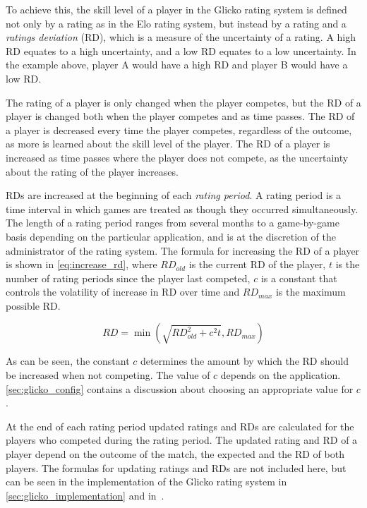 To achieve this, the skill level of a player in the Glicko rating system is defined not only by a rating as in the Elo rating system, but instead by a rating and a \emph{ratings deviation} (RD), which is a measure of the uncertainty of a rating.
A high RD equates to a high uncertainty, and a low RD equates to a low uncertainty.
In the example above, player A would have a high RD and player B would have a low RD.

The rating of a player is only changed when the player competes, but the RD of a player is changed both when the player competes and as time passes.
The RD of a player is decreased every time the player competes, regardless of the outcome, as more is learned about the skill level of the player.
The RD of a player is increased as time passes where the player does not compete, as the uncertainty about the rating of the player increases.

RDs are increased at the beginning of each \emph{rating period}.
A rating period is a time interval in which games are treated as though they occurred simultaneously.
The length of a rating period ranges from several months to a game-by-game basis depending on the particular application, and is at the discretion of the administrator of the rating system.
The formula for increasing the RD of a player is shown in \autoref{eq:increase_rd}, where $RD_{old}$ is the current RD of the player, $t$ is the number of rating periods since the player last competed, $c$ is a constant that controls the volatility of increase in RD over time and $RD_{max}$ is the maximum possible RD.

\begin{equation} \label{eq:increase_rd}
RD = \min \left( \sqrt{RD_{old}^2 + c^2t}, RD_{max} \right)
\end{equation}

As can be seen, the constant $c$ determines the amount by which the RD should be increased when not competing.
The value of $c$ depends on the application.
\autoref{sec:glicko_config} contains a discussion about choosing an appropriate value for $c$.

At the end of each rating period updated ratings and RDs are calculated for the players who competed during the rating period.
The updated rating and RD of a player depend on the outcome of the match, the expected and the RD of both players.
The formulas for updating ratings and RDs are not included here, but can be seen in the implementation of the Glicko rating system in \autoref{sec:glicko_implementation} and in~\citep{glicko}.

